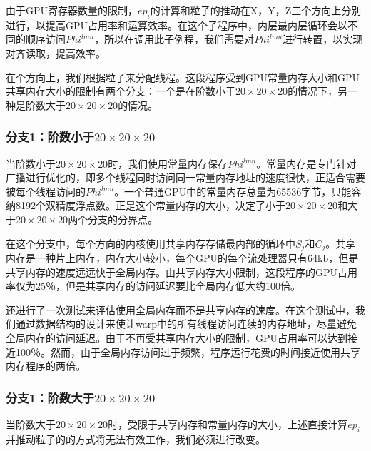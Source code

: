 由于GPU寄存器数量的限制，$ep_{i}$的计算和粒子的推动在X，Y，Z三个方向上分别进行，以提高GPU占用率和运算效率。在这个子程序中，内层最内层循环会以不同的顺序访问$Phi^{lmn}$，所以在调用此子例程，我们需要对$ Phi ^ {lmn} $进行转置，以实现对齐读取，提高效率。

在个方向上，我们根据粒子来分配线程。这段程序受到GPU常量内存大小和GPU共享内存大小的限制有两个分支：一个是在阶数小于$20 \times 20 \times 20$的情况下，另一种是阶数大于$20 \times 20 \times 20$的情况。
\subsubsection{分支1：阶数小于$20 \times 20 \times 20$}
当阶数小于$ 20\times20\times20 $时，我们使用常量内存保存$Phi^{lmn}$。常量内存是专门针对广播进行优化的，即多个线程同时访问同一常量内存地址的速度很快，正适合需要被每个线程访问的$Phi^{lmn}$。一个普通GPU中的常量内存总量为65536字节，只能容纳8192个双精度浮点数。正是这个常量内存的大小，决定了小于$20 \times 20 \times 20$和大于$20 \times 20 \times 20$两个分支的分界点。

在这个分支中，每个方向的内核使用共享内存存储最内部的循环中$ S_ {j} $和$ C_ {j} $。共享内存是一种片上内存，内存大小较小，每个GPU的每个流处理器只有64kb，但是共享内存的速度远远快于全局内存。由共享内存大小限制，这段程序的GPU占用率仅为25％，但是共享内存的访问延迟要比全局内存低大约100倍。

还进行了一次测试来评估使用全局内存而不是共享内存的速度。在这个测试中，我们通过数据结构的设计来使让warp中的所有线程访问连续的内存地址，尽量避免全局内存的访问延迟。由于不再受共享内存大小的限制，GPU占用率可以达到接近100％。然而，由于全局内存访问过于频繁，程序运行花费的时间接近使用共享内存程序的两倍。

\subsubsection{分支1：阶数大于$20 \times 20 \times 20$}
当阶数大于$20 \times 20 \times 20$时，受限于共享内存和常量内存的大小，上述直接计算$ep_ {i}$并推动粒子的的方式将无法有效工作，我们必须进行改变。

